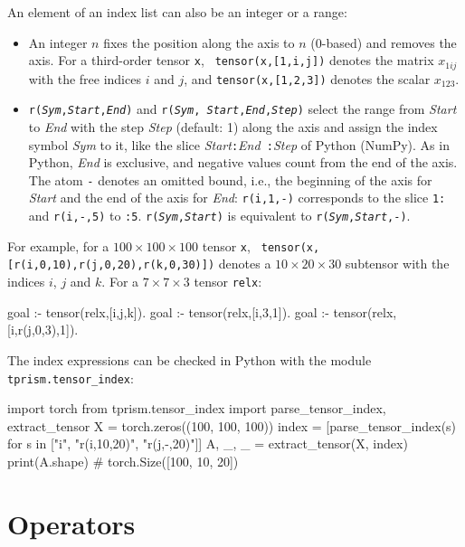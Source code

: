 \documentclass[a4paper]{report}
\begin{document}
An element of an index list can also be an integer or a range:
\begin{itemize}
	\item An integer $n$ fixes the position along the axis to $n$ (0-based)
	and removes the axis.  For a third-order tensor {\tt x}, {\tt
		tensor(x,[1,i,j])} denotes the matrix $x_{1ij}$ with the free indices
	$i$ and $j$, and {\tt tensor(x,[1,2,3])} denotes the scalar $x_{123}$.
	\item {\tt r({\it Sym},{\it Start},{\it End})} and {\tt r({\it Sym},{\it
			Start},{\it End},{\it Step})} select the range from {\it Start} to {\it
		End} with the step {\it Step} (default: 1) along the axis and assign the
	index symbol {\it Sym} to it, like the slice {\it Start}{\tt :}{\it End}{\tt
		:}{\it Step} of Python (NumPy).  As in Python, {\it End} is exclusive, and
	negative values count from the end of the axis.  The atom {\tt -} denotes
	an omitted bound, i.e., the beginning of the axis for {\it Start} and the
	end of the axis for {\it End}: {\tt r(i,1,-)} corresponds to the slice
	{\tt 1:} and {\tt r(i,-,5)} to {\tt :5}.  {\tt r({\it Sym},{\it Start})}
	is equivalent to {\tt r({\it Sym},{\it Start},-)}.
\end{itemize}
For example, for a $100\times 100 \times 100$ tensor {\tt x}, {\tt
	tensor(x,[r(i,0,10),r(j,0,20),r(k,0,30)])} denotes a $10\times 20\times 30$
subtensor with the indices $i$, $j$ and $k$.  For a $7\times 7\times 3$
tensor {\tt relx}:
\begin{prologcode}
goal :- tensor(relx,[i,j,k]).          %
goal :- tensor(relx,[i,3,1]).          %
goal :- tensor(relx,[i,r(j,0,3),1]).   %
\end{prologcode}
The index expressions can be checked in Python with the module {\tt tprism.tensor\_index}:
\begin{pythoncode}
import torch
from tprism.tensor_index import parse_tensor_index, extract_tensor
X = torch.zeros((100, 100, 100))
index = [parse_tensor_index(s) for s in ["i", "r(i,10,20)", "r(j,-,20)"]]
A, _, _ = extract_tensor(X, index)
print(A.shape)    # torch.Size([100, 10, 20])
\end{pythoncode}

\section{Operators}
\label{sec:operator}
\end{document}
